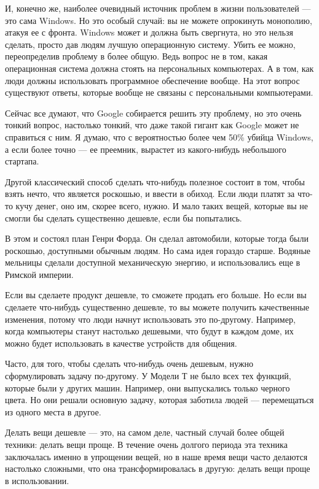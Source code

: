 \documentclass[ebook,12pt,oneside,openany]{memoir}
\begin{document}
И, конечно же, наиболее очевидный источник проблем в жизни
пользователей — это сама Windows. Но это особый случай: вы не можете
опрокинуть монополию, атакуя ее с фронта. Windows может и должна быть
свергнута, но это нельзя сделать, просто дав людям лучшую операционную
систему. Убить ее можно, переопределив проблему в более общую. Ведь
вопрос не в том, какая операционная система должна стоять на
персональных компьютерах. А в том, как люди должны использовать
программное обеспечение вообще. На этот вопрос существуют ответы,
которые вообще не связаны с персональными компьютерами.

Сейчас все думают, что Google собирается решить эту проблему, но это
очень тонкий вопрос, настолько тонкий, что даже такой гигант как
Google может не справиться с ним. Я думаю, что с вероятностью более
чем 50\% убийца Windows, а если более точно — ее преемник, вырастет из
какого-нибудь небольшого стартапа.

Другой классический способ сделать что-нибудь полезное состоит в том,
чтобы взять нечто, что является роскошью, и ввести в обиход. Если люди
платят за что-то кучу денег, оно им, скорее всего, нужно. И мало таких
вещей, которые вы не смогли бы сделать существенно дешевле, если бы
попытались.

В этом и состоял план Генри Форда. Он сделал автомобили, которые тогда
были роскошью, доступными обычным людям. Но сама идея гораздо старше.
Водяные мельницы сделали доступной механическую энергию, и
использовались еще в Римской империи.

Если вы сделаете продукт дешевле, то сможете продать его больше. Но
если вы сделаете что-нибудь существенно дешевле, то вы можете получить
качественные изменения, потому что люди начнут использовать это
по-другому. Например, когда компьютеры станут настолько дешевыми, что
будут в каждом доме, их можно будет использовать в качестве устройств
для общения.

Часто, для того, чтобы сделать что-нибудь очень дешевым, нужно
сформулировать задачу по-другому. У Модели Т не было всех тех функций,
которые были у других машин. Например, они выпускались только черного
цвета. Но они решали основную задачу, которая заботила людей —
перемещаться из одного места в другое.

Делать вещи дешевле — это, на самом деле, частный случай более общей
техники: делать вещи проще. В течение очень долгого периода эта
техника заключалась именно в упрощении вещей, но в наше время вещи
часто делаются настолько сложными, что она трансформировалась в
другую: делать вещи проще в использовании.
\end{document}
